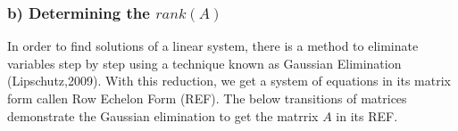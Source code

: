 \documentclass[a4paper]{report}
\begin{document}
\vspace{3mm}

\subsubsection*{b) Determining the $rank(A)$}

In order to find solutions of a linear system, there is a method to eliminate variables step by step using a technique known as Gaussian Elimination (Lipschutz,2009). With this reduction, we get a system of equations in its matrix form callen Row Echelon Form (REF). The below transitions of matrices demonstrate the Gaussian elimination to get the matrrix $A$ in its REF.

\newpage

\vspace{10mm}
\end{document}
